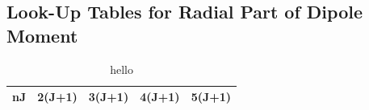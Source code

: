 \documentclass[12pt,a4paper,margin=1in]{report}
\begin{document}
\begin{appendices}
\chapter{Look-Up Tables for Radial Part of Dipole Moment}


\begin{table}[h]
\centering
\begin{tabular}{ccccc}\hline \hline
nJ & 2(J+1) & 3(J+1) & 4(J+1) & 5(J+1) \\ \hline
\end{tabular}
\caption{hello}
\label{Rad_calc}
\end{table}




\end{appendices}
\end{document}
